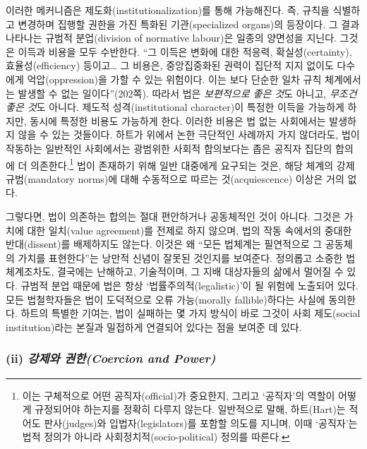 \documentclass[12pt, oneside]{book}  %
\begin{document}
이러한 메커니즘은 제도화(institutionalization)를 통해 가능해진다. 즉,
규칙을 식별하고 변경하며 집행할 권한을 가진 특화된 기관(specialized
organs)의 등장이다. 그 결과 나타나는 규범적 분업(division of normative
labour)은 일종의 양면성을 지닌다. 그것은 이득과 비용을 모두 수반한다.
``그 이득은 변화에 대한 적응력, 확실성(certainty), 효율성(efficiency)
등이고\ldots{} 그 비용은, 중앙집중화된 권력이 집단적 지지 없이도
다수에게 억압(oppression)을 가할 수 있는 위험이다. 이는 보다 단순한 일차
규칙 체계에서는 발생할 수 없는 일이다''(202쪽). 따라서 법은
\emph{보편적으로 좋은 것}도 아니고, \emph{무조건 좋은 것}도 아니다.
제도적 성격(institutional character)이 특정한 이득을 가능하게 하지만,
동시에 특정한 비용도 가능하게 한다. 이러한 비용은 법 없는 사회에서는
발생하지 않을 수 있는 것들이다. 하트가 위에서 논한 극단적인 사례까지
가지 않더라도, 법이 작동하는 일반적인 사회에서는 광범위한 사회적
합의보다는 좁은 공직자 집단의 합의에 더 의존한다.\footnote{이는
  구체적으로 어떤 공직자(official)가 중요한지, 그리고 `공직자'의 역할이
  어떻게 규정되어야 하는지를 정확히 다루지 않는다. 일반적으로 말해,
  하트(Hart)는 적어도 판사(judges)와 입법자(legislators)를 포함할 의도를
  지니며, 이때 `공직자'는 법적 정의가 아니라 사회정치적(socio-political)
  정의를 따른다.} 법이 존재하기 위해 일반 대중에게 요구되는 것은, 해당
체계의 강제 규범(mandatory norms)에 대해 수동적으로 따르는
것(acquiescence) 이상은 거의 없다.

그렇다면, 법이 의존하는 합의는 절대 편안하거나 공동체적인 것이 아니다.
그것은 가치에 대한 일치(value agreement)를 전제로 하지 않으며, 법의 작동
속에서의 중대한 반대(dissent)를 배제하지도 않는다. 이것은 왜 ``모든
법체계는 필연적으로 그 공동체의 가치를 표현한다''는 낭만적 신념이 잘못된
것인지를 보여준다. 정의롭고 소중한 법체계조차도, 결국에는 난해하고,
기술적이며, 그 지배 대상자들의 삶에서 멀어질 수 있다. 규범적 분업 때문에
법은 항상 `법률주의적(legalistic)'이 될 위험에 노출되어 있다. 모든
법철학자들은 법이 도덕적으로 오류 가능(morally fallible)하다는 사실에
동의한다. 하트의 특별한 기여는, 법이 실패하는 몇 가지 방식이 바로 그것이
사회 제도(social institution)라는 본질과 밀접하게 연결되어 있다는 점을
보여준 데 있다.

\subsubsection{\texorpdfstring{(ii) \emph{강제와 권한(Coercion and
Power)}}{(ii) 강제와 권한(Coercion and Power)}}\label{ii-uxac15uxc81cuxc640-uxad8cuxd55ccoercion-and-power}
\end{document}
